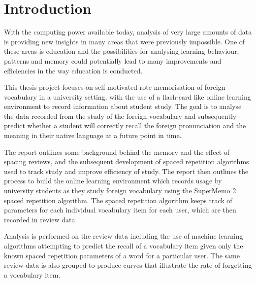 \chapter*{Introduction}

With the computing power available today, analysis of very large amounts of data is providing
new insights in many areas that were previously impossible. One of these areas is
education and the possibilities for analysing learning behaviour, patterns and memory
could potentially lead to many improvements and efficiencies in the way education is conducted.

This thesis project focuses on self-motivated rote memorisation of foreign vocabulary in
a university setting, with the use of a flash-card like online learning
environment to record information about student study. The goal is to analyse the data
recorded from the study of the foreign vocabulary and subsequently predict whether a student will
correctly recall the foreign pronunciation and the meaning in their native language
at a future point in time.

The report outlines some background behind the memory and the effect of spacing reviews,
and the subsequent development of spaced repetition algorithms used to track study
and improve efficiency of study. The report then outlines the process to build the
online learning environment which records usage by university students as they
study foreign vocabulary using the SuperMemo 2 spaced repetition algorithm. The spaced
repetition algorithm keeps track of parameters for each individual vocabulary item for
each user, which are then recorded in review data.

Analysis is performed on the review data including the use of machine learning algorithms
attempting to predict the recall of a vocabulary item given only the known spaced repetition parameters
of a word for a particular user. The same review data is also grouped to produce curves
that illustrate the rate of forgetting a vocabulary item.
